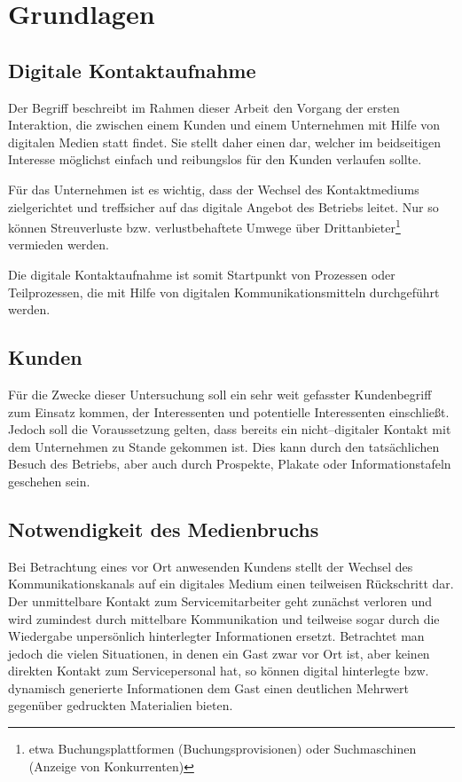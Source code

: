\section{Grundlagen} %
\label{sec:grundlagen}

\subsection{Digitale Kontaktaufnahme} %
\label{sub:digitale_kontaktaufnahme}

Der Begriff  beschreibt im Rahmen dieser Arbeit den Vorgang der ersten Interaktion, die zwischen einem Kunden und einem Unternehmen mit Hilfe von digitalen Medien statt findet. Sie stellt daher einen  dar, welcher im beidseitigen Interesse möglichst einfach und reibungslos für den Kunden verlaufen sollte. 

Für das Unternehmen ist es wichtig, dass der Wechsel des Kontaktmediums zielgerichtet und treffsicher auf das digitale Angebot des Betriebs leitet. Nur so können Streuverluste bzw. verlustbehaftete Umwege über Drittanbieter\footnote{etwa Buchungsplattformen (Buchungsprovisionen) oder Suchmaschinen (Anzeige von Konkurrenten)} vermieden werden.

Die digitale Kontaktaufnahme ist somit Startpunkt von Prozessen oder Teilprozessen, die mit Hilfe von digitalen Kommunikationsmitteln durchgeführt werden.

\subsection{Kunden} %
\label{sub:kunden}

Für die Zwecke dieser Untersuchung soll ein sehr weit gefasster Kundenbegriff zum Einsatz kommen, der Interessenten und potentielle Interessenten einschließt. Jedoch soll die Voraussetzung gelten, dass bereits ein nicht--digitaler Kontakt mit dem Unternehmen zu Stande gekommen ist. Dies kann durch den tatsächlichen Besuch des Betriebs, aber auch durch Prospekte, Plakate oder Informationstafeln geschehen sein.

\subsection{Notwendigkeit des Medienbruchs} %
\label{sub:medienbruch}

Bei Betrachtung eines vor Ort anwesenden Kundens stellt der Wechsel des Kommunikationskanals auf ein digitales Medium einen teilweisen Rückschritt dar. Der unmittelbare Kontakt zum Servicemitarbeiter geht zunächst verloren und wird zumindest durch mittelbare Kommunikation und teilweise sogar durch die Wiedergabe unpersönlich hinterlegter Informationen ersetzt.
Betrachtet man jedoch die vielen Situationen, in denen ein Gast zwar vor Ort ist, aber keinen direkten Kontakt zum Servicepersonal hat, so können digital hinterlegte bzw. dynamisch generierte Informationen dem Gast einen deutlichen Mehrwert gegenüber gedruckten Materialien bieten.

